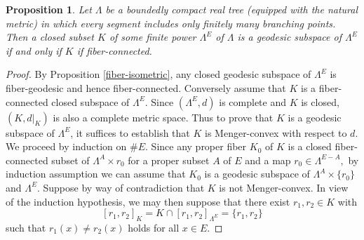 \documentclass[10pt,a4paper]{amsart}
\newtheorem{proposition}{Proposition}
\begin{document}
\begin{proposition} \label{fiber-connected} Let  $\Lambda$ be a boundedly compact real tree (equipped with the natural metric) in which every segment includes only
finitely many branching points. Then a closed subset $K$ of some finite power ${\Lambda}^E$ of $\Lambda$ is a geodesic subspace of $\Lambda^E$ if and only
if $K$ if fiber-connected.
\end{proposition}

\begin{proof} By Proposition \ref{fiber-isometric}, any closed geodesic subspace of $\Lambda^E$ is fiber-geodesic and hence fiber-connected. Conversely
assume that $K$ is a fiber-connected closed subspace of $\Lambda^E$.  Since $({\Lambda}^E,d)$ is  complete and $K$ is closed, $(K,d|_{K})$ is also
a complete metric space. Thus to prove that $K$ is a geodesic subspace of ${\Lambda}^E$, it suffices
to establish that $K$ is Menger-convex with respect to $d$. We proceed by induction on $\#E.$ Since any proper fiber ${K}_0$ of $K$
is a closed fiber-connected subset of ${\Lambda}^A\times r_0$ for a proper subset $A$ of $E$ and a map $r_0\in \Lambda^{E-A},$
by induction assumption we can assume that ${K}_0$ is a geodesic subspace of ${\Lambda}^A\times \{ r_0\}$ and $\Lambda^E$. Suppose by way
of contradiction that $K$ is not Menger-convex. In view of the induction hypothesis, we may then suppose that
there exist $r_1, r_2 \in {K}$ with
$$[r_1, r_2]_{K}=K \cap [r_1,r_2]_{\Lambda^E}= \{ r_1, r_2\}$$
such that $r_1(x) \neq r_2(x)$ holds for all $x \in E.$


\end{proof}
\end{document}
